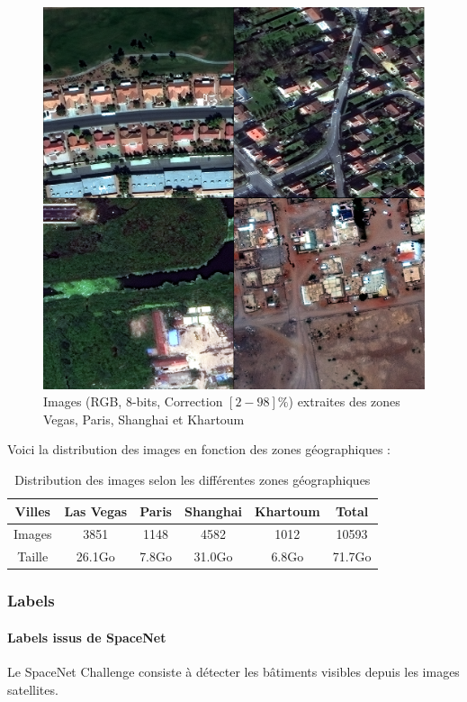 \documentclass[a4paper, 11pt]{report}
\begin{document}
\begin{figure}[H]
	\centering
	\includegraphics[scale=0.3]{Images/MUL_PAN.png}
	\caption{Images (RGB, 8-bits, Correction $[2-98]\%$) extraites des zones Vegas, Paris, Shanghai et Khartoum}
\end{figure}

Voici la distribution des images en fonction des zones géographiques :
\begin{table}[H]
	\centering
	 \begin{tabular}{|c|c|c|c|c|c|}
	\hline 
	Villes & Las Vegas & Paris & Shanghai & Khartoum & Total \\ 
	\hline 
	Images & 3851 & 1148 & 4582 & 1012 & 10593 \\ 
	\hline 
	Taille & 26.1Go & 7.8Go & 31.0Go & 6.8Go & 71.7Go \\ 
	\hline 
	\end{tabular}
	\caption{Distribution des images selon les différentes zones géographiques}
\end{table} 
\subsubsection{Labels}
\paragraph{Labels issus de SpaceNet}
Le SpaceNet Challenge consiste à détecter les bâtiments visibles depuis les images satellites.
\end{document}
